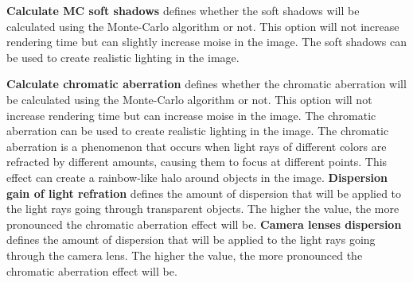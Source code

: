 \textbf{Calculate MC soft shadows} defines whether the soft shadows will be calculated using the Monte-Carlo algorithm or not. This option will not increase rendering time but can slightly increase moise in the image. The soft shadows can be used to create realistic lighting in the image.

\textbf{Calculate chromatic aberration} defines whether the chromatic aberration will be calculated using the Monte-Carlo algorithm or not. This option will not increase rendering time but can increase moise in the image. The chromatic aberration can be used to create realistic lighting in the image. The chromatic aberration is a phenomenon that occurs when light rays of different colors are refracted by different amounts, causing them to focus at different points. This effect can create a rainbow-like halo around objects in the image. \textbf{Dispersion gain of light refration} defines the amount of dispersion that will be applied to the light rays going through transparent objects. The higher the value, the more pronounced the chromatic aberration effect will be. \textbf{Camera lenses dispersion} defines the amount of dispersion that will be applied to the light rays going through the camera lens. The higher the value, the more pronounced the chromatic aberration effect will be. 
